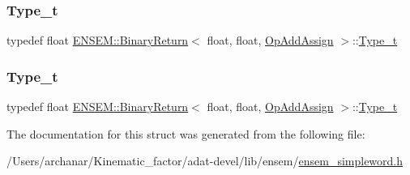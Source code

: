 \mbox{\label{structENSEM_1_1BinaryReturn_3_01float_00_01float_00_01OpAddAssign_01_4_af39f6f2b4b50fa85e57dfdabddfab31a}} 
\subsubsection{\texorpdfstring{Type\_t}{Type\_t}\hspace{0.1cm}{\footnotesize\ttfamily [2/3]}}
{\footnotesize\ttfamily typedef float \mbox{\hyperlink{structENSEM_1_1BinaryReturn}{E\+N\+S\+E\+M\+::\+Binary\+Return}}$<$ float, float, \mbox{\hyperlink{structENSEM_1_1OpAddAssign}{Op\+Add\+Assign}} $>$\+::\mbox{\hyperlink{structENSEM_1_1BinaryReturn_3_01float_00_01float_00_01OpAddAssign_01_4_af39f6f2b4b50fa85e57dfdabddfab31a}{Type\+\_\+t}}}

\mbox{\label{structENSEM_1_1BinaryReturn_3_01float_00_01float_00_01OpAddAssign_01_4_af39f6f2b4b50fa85e57dfdabddfab31a}} 
\subsubsection{\texorpdfstring{Type\_t}{Type\_t}\hspace{0.1cm}{\footnotesize\ttfamily [3/3]}}
{\footnotesize\ttfamily typedef float \mbox{\hyperlink{structENSEM_1_1BinaryReturn}{E\+N\+S\+E\+M\+::\+Binary\+Return}}$<$ float, float, \mbox{\hyperlink{structENSEM_1_1OpAddAssign}{Op\+Add\+Assign}} $>$\+::\mbox{\hyperlink{structENSEM_1_1BinaryReturn_3_01float_00_01float_00_01OpAddAssign_01_4_af39f6f2b4b50fa85e57dfdabddfab31a}{Type\+\_\+t}}}



The documentation for this struct was generated from the following file\+:\begin{DoxyCompactItemize}
\item 
/\+Users/archanar/\+Kinematic\+\_\+factor/adat-\/devel/lib/ensem/\mbox{\hyperlink{adat-devel_2lib_2ensem_2ensem__simpleword_8h}{ensem\+\_\+simpleword.\+h}}\end{DoxyCompactItemize}
